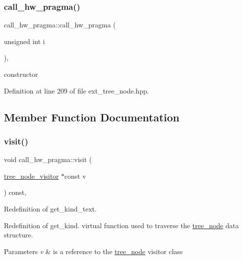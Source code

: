 \subsubsection{\texorpdfstring{call\+\_\+hw\+\_\+pragma()}{call\_hw\_pragma()}}
{\footnotesize\ttfamily call\+\_\+hw\+\_\+pragma\+::call\+\_\+hw\+\_\+pragma (\begin{DoxyParamCaption}\item[{unsigned int}]{i }\end{DoxyParamCaption})\hspace{0.3cm}{\ttfamily [inline]}, {\ttfamily [explicit]}}



constructor 



Definition at line 209 of file ext\+\_\+tree\+\_\+node.\+hpp.



\subsection{Member Function Documentation}
\mbox{\label{structcall__hw__pragma_a7ad2f9a214388ac8de0806ff6c8db2bc}} 
\subsubsection{\texorpdfstring{visit()}{visit()}}
{\footnotesize\ttfamily void call\+\_\+hw\+\_\+pragma\+::visit (\begin{DoxyParamCaption}\item[{\hyperlink{classtree__node__visitor}{tree\+\_\+node\+\_\+visitor} $\ast$const}]{v }\end{DoxyParamCaption}) const\hspace{0.3cm}{\ttfamily [override]}, {\ttfamily [virtual]}}



Redefinition of get\+\_\+kind\+\_\+text. 

Redefinition of get\+\_\+kind. virtual function used to traverse the \hyperlink{classtree__node}{tree\+\_\+node} data structure. 
\begin{DoxyParams}{Parameters}
{\em v} & is a reference to the \hyperlink{classtree__node}{tree\+\_\+node} visitor class \\
\hline
\end{DoxyParams}


